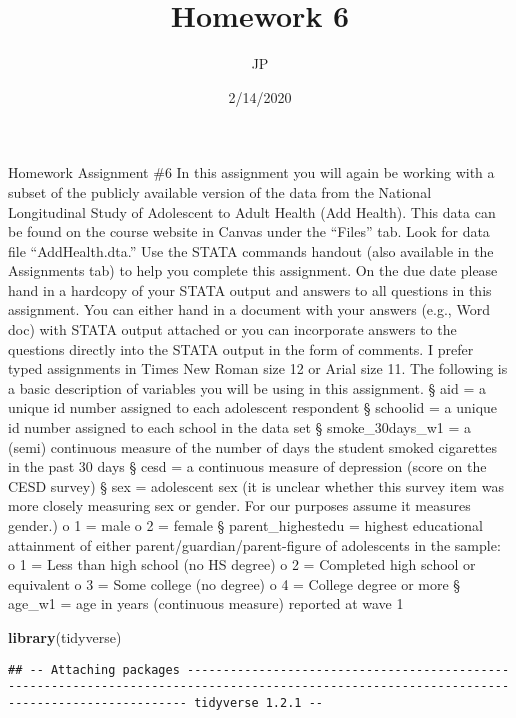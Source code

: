 \documentclass[]{article}
\title{Homework 6}
\author{JP}
\date{2/14/2020}
\newenvironment{Shaded}{\begin{snugshade}}{\end{snugshade}}
\newcommand{\KeywordTok}[1]{\textcolor[rgb]{0.13,0.29,0.53}{\textbf{#1}}}
\newcommand{\NormalTok}[1]{#1}
\begin{document}
\maketitle

Homework Assignment \#6 In this assignment you will again be working
with a subset of the publicly available version of the data from the
National Longitudinal Study of Adolescent to Adult Health (Add Health).
This data can be found on the course website in Canvas under the
``Files'' tab. Look for data file ``AddHealth.dta.'' Use the STATA
commands handout (also available in the Assignments tab) to help you
complete this assignment. On the due date please hand in a hardcopy of
your STATA output and answers to all questions in this assignment. You
can either hand in a document with your answers (e.g., Word doc) with
STATA output attached or you can incorporate answers to the questions
directly into the STATA output in the form of comments. I prefer typed
assignments in Times New Roman size 12 or Arial size 11. The following
is a basic description of variables you will be using in this
assignment. § aid = a unique id number assigned to each adolescent
respondent § schoolid = a unique id number assigned to each school in
the data set § smoke\_30days\_w1 = a (semi) continuous measure of the
number of days the student smoked cigarettes in the past 30 days § cesd
= a continuous measure of depression (score on the CESD survey) § sex =
adolescent sex (it is unclear whether this survey item was more closely
measuring sex or gender. For our purposes assume it measures gender.) o
1 = male o 2 = female § parent\_highestedu = highest educational
attainment of either parent/guardian/parent-figure of adolescents in the
sample: o 1 = Less than high school (no HS degree) o 2 = Completed high
school or equivalent o 3 = Some college (no degree) o 4 = College degree
or more § age\_w1 = age in years (continuous measure) reported at wave 1

\begin{Shaded}
\begin{Highlighting}[]
\KeywordTok{library}\NormalTok{(tidyverse)}
\end{Highlighting}
\end{Shaded}

\begin{verbatim}
## -- Attaching packages -------------------------------------------------------------------------------------------------------------------------------------------- tidyverse 1.2.1 --
\end{verbatim}
\end{document}
